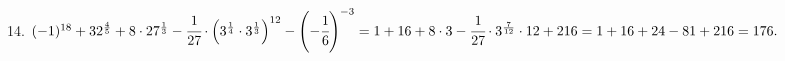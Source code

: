 14. $(-1)^{18}+32^\frac{4}{5}+8\cdot27^\frac{1}{3}-\cfrac{1}{27}\cdot\left(3^\frac{1}{4}\cdot3^\frac{1}{3}\right)^{12}-\left(-\cfrac{1}{6}\right)^{-3}=
1+16+8\cdot3-\cfrac{1}{27}\cdot 3^\frac{7}{12}\cdot12+216=
1+16+24-81+216=176.$\\
